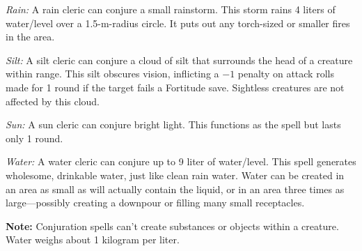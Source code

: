 {	\textit{Rain:} A rain cleric can conjure a small rainstorm. This storm rains 4 liters of water/level over a 1.5-m-radius circle. It puts out any torch-sized or smaller fires in the area.

	\textit{Silt:} A silt cleric can conjure a cloud of silt that surrounds the head of a creature within range. This silt obscures vision, inflicting a $-1$ penalty on attack rolls made for 1 round if the target fails a Fortitude save. Sightless creatures are not affected by this cloud.

	\textit{Sun:} A sun cleric can conjure bright light. This functions as the  spell but lasts only 1 round.

	\textit{Water:} A water cleric can conjure up to 9 liter of water/level. This spell generates wholesome, drinkable water, just like clean rain water. Water can be created in an area as small as will actually contain the liquid, or in an area three times as large---possibly creating a downpour or filling many small receptacles.

	\textbf{Note:} Conjuration spells can't create substances or objects within a creature. Water weighs about 1 kilogram per liter.
}
